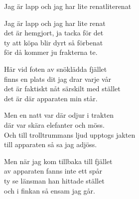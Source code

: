 \begin{song}{Jag är lapp och jag har lite renat}{literenat}
\begin{vers}
Jag är lapp och jag har lite renat\\
det är hemgjort, ja tacka för det\\
ty att köpa blir dyrt så förbenat\\
för då kommer ju frakterna te.\\
\end{vers}
\begin{vers}
Här vid foten av snöklädda fjället\\
finns en plats dit jag drar varje vår\\
det är faktiskt nåt särskilt med stället\\
det är där apparaten min står.\\
\end{vers}
\begin{vers}
Men en natt var där odjur i trakten\\
där var skära elefanter och möss.\\
Och till trolltrummans ljud upptogs jakten\\
till apparaten så sa jag adjöss.\\
\end{vers}
\begin{vers}
Men när jag kom tillbaka till fjället\\
av apparaten fanns inte ett spår\\
ty se länsman han hittade stället\\
och i finkan så ensam jag går.\\
\end{vers}
\end{song}
